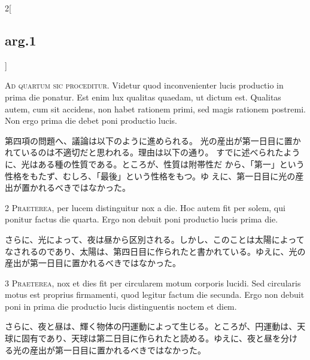 \documentclass[paper=a4paper,fontsize=10pt,jafontsize=9pt,titlepage]{jlreq}
\begin{document}
\begin{paracol}{2}[\subsection{arg.1}]

{\huge A}{\scshape d quartum sic proceditur}. Videtur quod
inconvenienter lucis productio in prima die ponatur. Est enim lux
qualitas quaedam, ut dictum est. Qualitas autem, cum sit accidens, non
habet rationem primi, sed magis rationem postremi. Non ergo prima die
debet poni productio lucis.

\switchcolumn

第四項の問題へ、議論は以下のように進められる。
光の産出が第一日目に置かれているのは不適切だと思われる。理由は以下の通り。
すでに述べられたように、光はある種の性質である。ところが、性質は附帯性だ
 から、「第一」という性格をもたず、むしろ、「最後」という性格をもつ。ゆ
 えに、第一日目に光の産出が置かれるべきではなかった。


{\scshape 2 Praeterea}, per lucem distinguitur nox a
die. Hoc autem fit per solem, qui ponitur factus die quarta. Ergo non
debuit poni productio lucis prima die.

\switchcolumn

さらに、光によって、夜は昼から区別される。しかし、このことは太陽によって
なされるのであり、太陽は、第四日目に作られたと書かれている。ゆえに、光の
 産出が第一日目に置かれるべきではなかった。


{\scshape 3 Praeterea}, nox et dies fit per circularem
motum corporis lucidi. Sed circularis motus est proprius firmamenti,
quod legitur factum die secunda. Ergo non debuit poni in prima die
productio lucis distinguentis noctem et diem.

\switchcolumn

さらに、夜と昼は、輝く物体の円運動によって生じる。ところが、円運動は、天
 球に固有であり、天球は第二日目に作られたと読める。ゆえに、夜と昼を分け
 る光の産出が第一日目に置かれるべきではなかった。

\switchcolumn*


\end{paracol}
\end{document}
